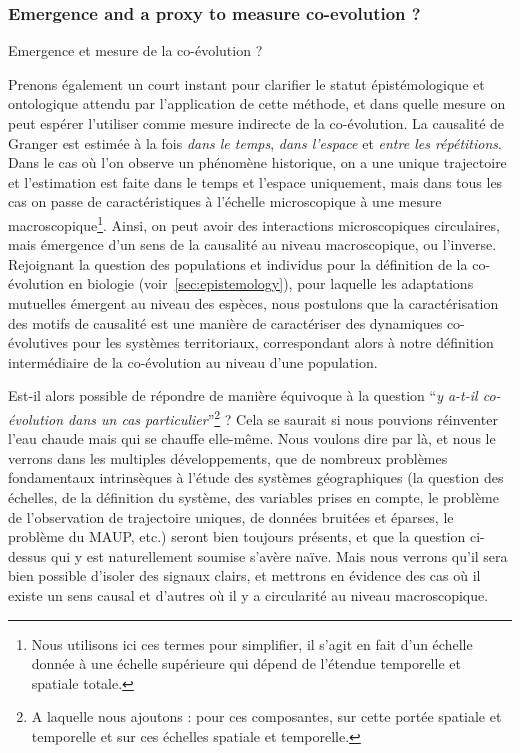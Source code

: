 \subsubsection{Emergence and a proxy to measure co-evolution ?}{Emergence et mesure de la co-évolution ?}



Prenons également un court instant pour clarifier le statut épistémologique et ontologique attendu par l'application de cette méthode, et dans quelle mesure on peut espérer l'utiliser comme mesure indirecte de la co-évolution. La causalité de Granger est estimée à la fois \emph{dans le temps}, \emph{dans l'espace} et \emph{entre les répétitions}. Dans le cas où l'on observe un phénomène historique, on a une unique trajectoire et l'estimation est faite dans le temps et l'espace uniquement, mais dans tous les cas on passe de caractéristiques à l'échelle microscopique à une mesure macroscopique\footnote{Nous utilisons ici ces termes pour simplifier, il s'agit en fait d'un échelle donnée à une échelle supérieure qui dépend de l'étendue temporelle et spatiale totale.}. Ainsi, on peut avoir des interactions microscopiques circulaires, mais émergence d'un sens de la causalité au niveau macroscopique, ou l'inverse. Rejoignant la question des populations et individus pour la définition de la co-évolution en biologie (voir~\ref{sec:epistemology}), pour laquelle les adaptations mutuelles émergent au niveau des espèces, nous postulons que la caractérisation des motifs de causalité est une manière de caractériser des dynamiques co-évolutives pour les systèmes territoriaux, correspondant alors à notre définition intermédiaire de la co-évolution au niveau d'une population.


Est-il alors possible de répondre de manière équivoque à la question ``\textit{y a-t-il co-évolution dans un cas particulier}''\footnote{A laquelle nous ajoutons : pour ces composantes, sur cette portée spatiale et temporelle et sur ces échelles spatiale et temporelle.} ? Cela se saurait si nous pouvions réinventer l'eau chaude mais qui se chauffe elle-même. Nous voulons dire par là, et nous le verrons dans les multiples développements, que de nombreux problèmes fondamentaux intrinsèques à l'étude des systèmes géographiques (la question des échelles, de la définition du système, des variables prises en compte, le problème de l'observation de trajectoire uniques, de données bruitées et éparses, le problème du MAUP, etc.) seront bien toujours présents, et que la question ci-dessus qui y est naturellement soumise s'avère naïve. Mais nous verrons qu'il sera bien possible d'isoler des signaux clairs, et mettrons en évidence des cas où il existe un sens causal et d'autres où il y a circularité au niveau macroscopique.


